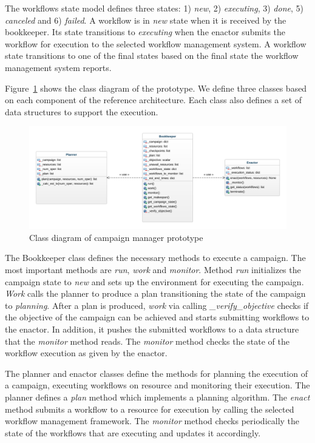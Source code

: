 The workflows state model defines three states: 1) \textit{new}, 2) \textit{executing}, 3) \textit{done}, 5) \textit{canceled} and 6) \textit{failed}.
A workflow is in \textit{new} state when it is received by the bookkeeper.
Its state transitions to \textit{executing} when the enactor submits the workflow for execution to the selected workflow management system.
A workflow state transitions to one of the final states based on the final state the workflow management system reports.

Figure~\ref{fig:rcm_class_diagram} shows the class diagram of the prototype.
We define three classes based on each component of the reference architecture.
Each class also defines a set of data structures to support the execution.

\begin{figure}[t]
    \centering
    \includegraphics[width=.95\textwidth]{figures/manager/class_diagram.png}
    \caption{Class diagram of campaign manager prototype}\label{fig:rcm_class_diagram}
\end{figure}

The Bookkeeper class defines the necessary methods to execute a campaign.
The most important methods are \textit{run}, \textit{work} and \textit{monitor}.
Method \textit{run} initializes the campaign state to \textit{new} and sets up the environment for executing the campaign.
\textit{Work} calls the planner to produce a plan transitioning the state of the campaign to \textit{planning}.
After a plan is produced, \textit{work} via calling \textit{\_verify\_objective} checks if the objective of the campaign can be achieved and starts submitting workflows to the enactor.
In addition, it pushes the submitted workflows to a data structure that the \textit{monitor} method reads.
The \textit{monitor} method checks the state of the workflow execution as given by the enactor.

The planner and enactor classes define the methods for planning the execution of a campaign, executing workflows on resource and monitoring their execution.
The planner defines a \textit{plan} method which implements a planning algorithm.
The \textit{enact} method submits a workflow to a resource for execution by calling the selected workflow management framework.
The \textit{monitor} method checks periodically the state of the workflows that are executing and updates it accordingly.

